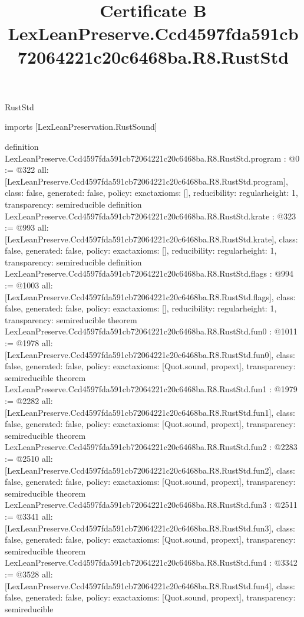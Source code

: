 \begin{lexlean}{RustStd}
\title{Certificate B LexLeanPreserve.Ccd4597fda591cb72064221c20c6468ba.R8.RustStd}
\begin{coremodule}
imports [LexLeanPreservation.RustSound]

definition LexLeanPreserve.Ccd4597fda591cb72064221c20c6468ba.R8.RustStd.program : @0 := @322 {
  all: [LexLeanPreserve.Ccd4597fda591cb72064221c20c6468ba.R8.RustStd.program],
  class: false,
  generated: false,
  policy: exact{axioms: []},
  reducibility: regular{height: 1},
  transparency: semireducible
}
definition LexLeanPreserve.Ccd4597fda591cb72064221c20c6468ba.R8.RustStd.krate : @323 := @993 {
  all: [LexLeanPreserve.Ccd4597fda591cb72064221c20c6468ba.R8.RustStd.krate],
  class: false,
  generated: false,
  policy: exact{axioms: []},
  reducibility: regular{height: 1},
  transparency: semireducible
}
definition LexLeanPreserve.Ccd4597fda591cb72064221c20c6468ba.R8.RustStd.flags : @994 := @1003 {
  all: [LexLeanPreserve.Ccd4597fda591cb72064221c20c6468ba.R8.RustStd.flags],
  class: false,
  generated: false,
  policy: exact{axioms: []},
  reducibility: regular{height: 1},
  transparency: semireducible
}
theorem LexLeanPreserve.Ccd4597fda591cb72064221c20c6468ba.R8.RustStd.fun0 : @1011 := @1978 {
  all: [LexLeanPreserve.Ccd4597fda591cb72064221c20c6468ba.R8.RustStd.fun0],
  class: false,
  generated: false,
  policy: exact{axioms: [Quot.sound, propext]},
  transparency: semireducible
}
theorem LexLeanPreserve.Ccd4597fda591cb72064221c20c6468ba.R8.RustStd.fun1 : @1979 := @2282 {
  all: [LexLeanPreserve.Ccd4597fda591cb72064221c20c6468ba.R8.RustStd.fun1],
  class: false,
  generated: false,
  policy: exact{axioms: [Quot.sound, propext]},
  transparency: semireducible
}
theorem LexLeanPreserve.Ccd4597fda591cb72064221c20c6468ba.R8.RustStd.fun2 : @2283 := @2510 {
  all: [LexLeanPreserve.Ccd4597fda591cb72064221c20c6468ba.R8.RustStd.fun2],
  class: false,
  generated: false,
  policy: exact{axioms: [Quot.sound, propext]},
  transparency: semireducible
}
theorem LexLeanPreserve.Ccd4597fda591cb72064221c20c6468ba.R8.RustStd.fun3 : @2511 := @3341 {
  all: [LexLeanPreserve.Ccd4597fda591cb72064221c20c6468ba.R8.RustStd.fun3],
  class: false,
  generated: false,
  policy: exact{axioms: [Quot.sound, propext]},
  transparency: semireducible
}
theorem LexLeanPreserve.Ccd4597fda591cb72064221c20c6468ba.R8.RustStd.fun4 : @3342 := @3528 {
  all: [LexLeanPreserve.Ccd4597fda591cb72064221c20c6468ba.R8.RustStd.fun4],
  class: false,
  generated: false,
  policy: exact{axioms: [Quot.sound, propext]},
  transparency: semireducible
}
\end{coremodule}
\end{lexlean}
